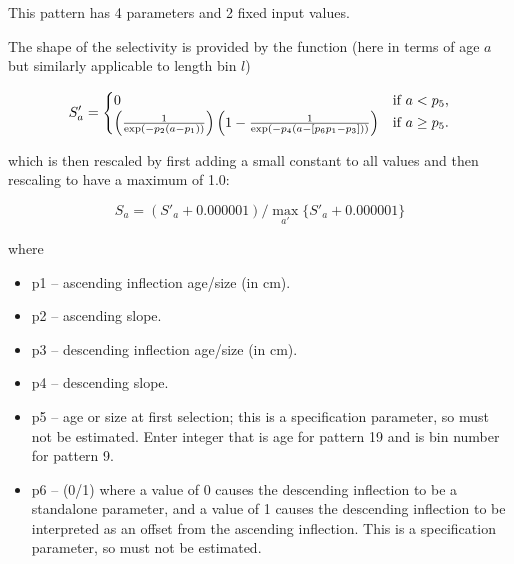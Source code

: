 
This pattern has 4 parameters and 2 fixed input values.

The shape of the selectivity is provided by the function (here in terms of age $a$ but similarly applicable to length bin $l$)

\begin{equation}
    S'_a =  
    \begin{cases}
      \hfil 0 & \text{if $a < p_5$,} \\
      \left( \frac{1}{\exp\left(-p_2 \left( a - p_1 \right) \right) } \right)
      \left(1 - \frac{1}{\exp\left(-p_4 \left( a - [p_6 p_1 - p_3]\right) \right) } \right)
      & \text{if $a \geq p_5$.}
    \end{cases}
 \end{equation}

 which is then rescaled by first adding a small constant to all values and then rescaling to have a maximum of 1.0:
 
 \begin{equation}
    S_a = (S'_a + 0.000001) / \max_{a'}\{S'_a + 0.000001\}
 \end{equation}

  where
	\begin{itemize}
		\item p1 – ascending inflection age/size (in cm).
		\item p2 – ascending slope. 
		\item p3 – descending inflection age/size (in cm).
		\item p4 – descending slope.
		\item p5 – age or size at first selection; this is a specification parameter, so must not be estimated.  Enter integer that is age for pattern 19 and is bin number for pattern 9.
		\item p6 – (0/1)  where a value of 0 causes the descending inflection to be a standalone parameter, and a value of 1 causes the descending inflection to be interpreted as an offset from the ascending inflection.  This is a specification parameter, so must not be estimated.
	\end{itemize}

